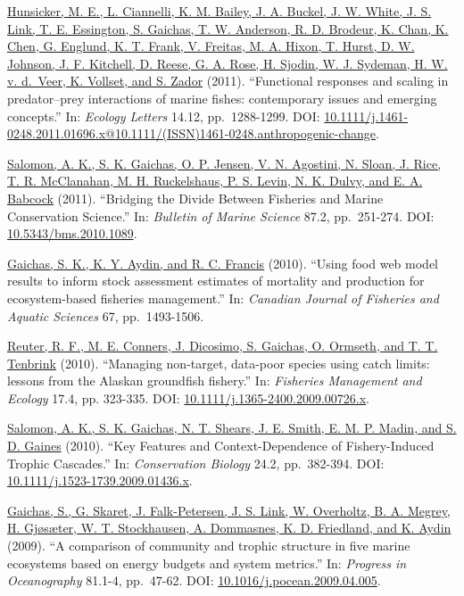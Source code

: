 \documentclass[11pt, a4paper]{awesome-cv}
\begin{document}
\protect\hyperlink{cite-hunsicker_functional_2011}{Hunsicker, M. E., L.
Ciannelli, K. M. Bailey, J. A. Buckel, J. W. White, J. S. Link, T. E.
Essington, S. Gaichas, T. W. Anderson, R. D. Brodeur, K. Chan, K. Chen,
G. Englund, K. T. Frank, V. Freitas, M. A. Hixon, T. Hurst, D. W.
Johnson, J. F. Kitchell, D. Reese, G. A. Rose, H. Sjodin, W. J. Sydeman,
H. W. v. d.~Veer, K. Vollset, and S. Zador} (2011). ``Functional
responses and scaling in predator--prey interactions of marine fishes:
contemporary issues and emerging concepts.'' In: \emph{Ecology Letters}
14.12, pp.~1288-1299. DOI:
\href{https://doi.org/10.1111\%2Fj.1461-0248.2011.01696.x\%4010.1111\%2F\%28ISSN\%291461-0248.anthropogenic-change}{10.1111/j.1461-0248.2011.01696.x@10.1111/(ISSN)1461-0248.anthropogenic-change}.

\protect\hyperlink{cite-salomon_bridging_2011}{Salomon, A. K., S. K.
Gaichas, O. P. Jensen, V. N. Agostini, N. Sloan, J. Rice, T. R.
McClanahan, M. H. Ruckelshaus, P. S. Levin, N. K. Dulvy, and E. A.
Babcock} (2011). ``Bridging the Divide Between Fisheries and Marine
Conservation Science.'' In: \emph{Bulletin of Marine Science} 87.2,
pp.~251-274. DOI:
\href{https://doi.org/10.5343\%2Fbms.2010.1089}{10.5343/bms.2010.1089}.

\protect\hyperlink{cite-gaichas_using_2010}{Gaichas, S. K., K. Y. Aydin,
and R. C. Francis} (2010). ``Using food web model results to inform
stock assessment estimates of mortality and production for
ecosystem-based fisheries management.'' In: \emph{Canadian Journal of
Fisheries and Aquatic Sciences} 67, pp.~1493-1506.

\protect\hyperlink{cite-reuter_managing_2010}{Reuter, R. F., M. E.
Conners, J. Dicosimo, S. Gaichas, O. Ormseth, and T. T. Tenbrink}
(2010). ``Managing non-target, data-poor species using catch limits:
lessons from the Alaskan groundfish fishery.'' In: \emph{Fisheries
Management and Ecology} 17.4, pp. 323-335. DOI:
\href{https://doi.org/10.1111\%2Fj.1365-2400.2009.00726.x}{10.1111/j.1365-2400.2009.00726.x}.

\protect\hyperlink{cite-salomon_key_2010}{Salomon, A. K., S. K. Gaichas,
N. T. Shears, J. E. Smith, E. M. P. Madin, and S. D. Gaines} (2010).
``Key Features and Context-Dependence of Fishery-Induced Trophic
Cascades.'' In: \emph{Conservation Biology} 24.2, pp.~382-394. DOI:
\href{https://doi.org/10.1111\%2Fj.1523-1739.2009.01436.x}{10.1111/j.1523-1739.2009.01436.x}.

\protect\hyperlink{cite-gaichas_comparison_2009}{Gaichas, S., G. Skaret,
J. Falk-Petersen, J. S. Link, W. Overholtz, B. A. Megrey, H. Gjøsæter,
W. T. Stockhausen, A. Dommasnes, K. D. Friedland, and K. Aydin} (2009).
``A comparison of community and trophic structure in five marine
ecosystems based on energy budgets and system metrics.'' In:
\emph{Progress in Oceanography} 81.1-4, pp.~47-62. DOI:
\href{https://doi.org/10.1016\%2Fj.pocean.2009.04.005}{10.1016/j.pocean.2009.04.005}.
\end{document}
